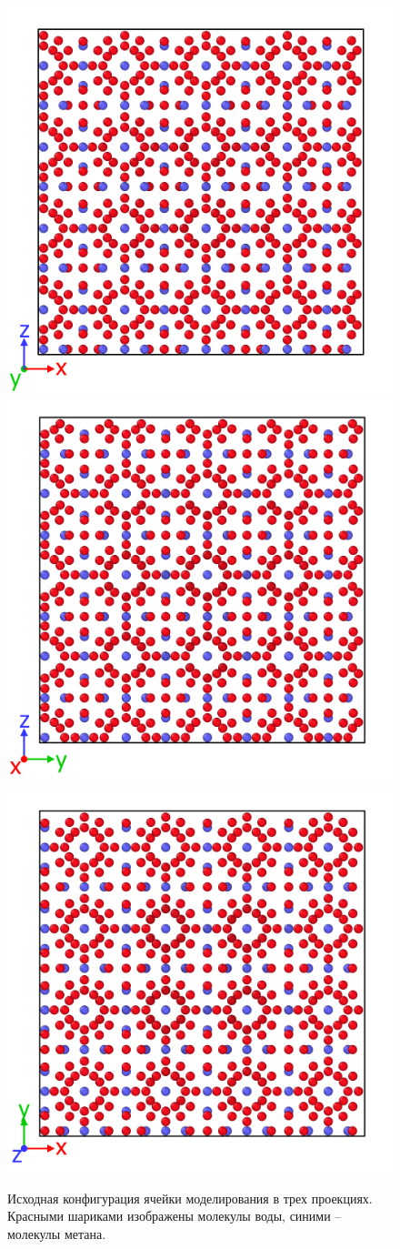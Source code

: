 \begin{figure}[H]
    \centering
    \begin{minipage}{\linewidth}
    \includegraphics[width=.325\linewidth]{figures/unit1.png}
    \includegraphics[width=.325\linewidth]{figures/unit2.png}
    \includegraphics[width=.325\linewidth]{figures/unit3.png}
    \end{minipage}
    \caption{Исходная конфигурация ячейки моделирования в трех проекциях. Красными шариками изображены молекулы воды, синими – молекулы метана.}
    \label{fig3.1}
\end{figure}

